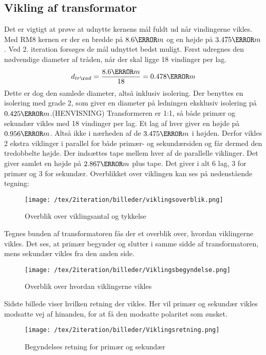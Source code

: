 \subsection{Vikling af transformator}
Det er vigtigt at prøve at udnytte kernens mål fuldt ud når vindingerne vikles. Med RM8 kernen er der en bredde på $8.6\milli m$ og en højde på $3.475\milli m$. Ved 2. iteration forsøges de mål udnyttet bedst muligt.
Først udregnes den nødvendige diameter af tråden, når der skal ligge 18 vindinger per lag. 
\begin{equation} \label{d_trad}
d_{tråd} = \frac{8.6\milli m}{18} = 0.478\milli m
\end{equation}
Dette er dog den samlede diameter, altså inklusiv isolering. Der benyttes en isolering med grade 2, som giver en diameter på ledningen eksklusiv isolering på $0.425\milli m$.(HENVISNING) Transformeren er 1:1, så både primær og sekundær vikles med 18 vindinger per lag. Et lag af hver giver en højde på $0.956\milli m$. Altså ikke i nærheden af de $3.475\milli m$ i højden. Derfor vikles 2 ekstra viklinger i parallel for både primær- og sekundærsiden og får dermed den tredobbelte højde. Der indsættes tape mellem hver af de parallelle viklinger. Det giver samlet en højde på $2.867\milli m$ plus tape. Det giver i alt 6 lag, 3 for primær og 3 for sekundær. Overblikket over viklingen kan ses på nedenstående tegning:
\begin{figure}[H]
	\center
	\texttt{[image: /tex/2iteration/billeder/viklingsoverblik.png]}
	\caption{Overblik over viklingsantal og tykkelse}
	\label{fig: viklingsoverblik}
\end{figure}
\noindent Tegnes bunden af transformatoren fås der et overblik over, hvordan viklingerne vikles. Det ses, at primær begynder og slutter i samme sidde af transformatoren, mens sekundær vikles fra den anden side.  
\begin{figure}[H]
	\center
	\texttt{[image: /tex/2iteration/billeder/Viklingsbegyndelse.png]}
	\caption{Overblik over hvordan viklingerne vikles}
	\label{fig: viklingsbegyndelse}
\end{figure}
\noindent Sidste billede viser hvilken retning der vikles. Her vil primær og sekundær vikles modsatte vej af hinanden, for at få den modsatte polaritet som ønsket.
\begin{figure}[H]
	\center
	\texttt{[image: /tex/2iteration/billeder/Viklingsretning.png]}
	\caption{Begyndelses retning for primær og sekundær}
	\label{fig: viklingsretning}
\end{figure}

